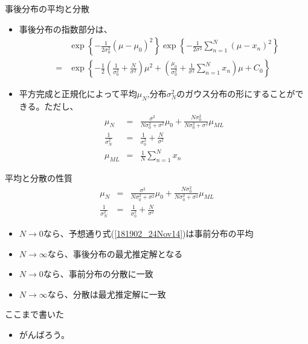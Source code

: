 \begin{frame}{事後分布の平均と分散}
 \begin{itemize}
  \item 事後分布の指数部分は、
        \begin{eqnarray}
         & &\exp\left\{-\frac{1}{2\sigma_0^2}(\mu-\mu_0)^2\right\} \exp\left\{-\frac{1}{2\sigma^2}\sum_{n=1}^{N}(\mu-x_n)^2\right\} \nonumber \\
         &= & \exp\left\{-\frac{1}{2}\left(\frac{1}{\sigma_0^2}+\frac{N}{\sigma^2}\right)\mu^2 +\left(\frac{\mu_0}{\sigma_0^2}+\frac{1}{\sigma^2}\sum_{n=1}^{N}x_n\right)\mu +C_0 \right\} \nonumber
        \end{eqnarray}
  \item 平方完成と正規化によって平均$\mu_N$,分布$\sigma_N^2$のガウス分布の形にすることができる。ただし、
        \begin{eqnarray}
         \mu_N& = & \frac{\sigma^2}{N\sigma_0^2+\sigma^2}\mu_0 + \frac{N\sigma_0^2}{N\sigma_0^2+\sigma^2}\mu_{ML}\label{223654_18Nov14}\\
         \frac{1}{\sigma_N^2}&= & \frac{1}{\sigma_0^2} + \frac{N}{\sigma^2}\label{181817_24Nov14}\\
         \mu_{ML}&= & \frac{1}{N}\sum_{n=1}^{N}x_n
        \end{eqnarray}
 \end{itemize}
\end{frame}

\begin{frame}{平均と分散の性質}
 \begin{eqnarray}
  \mu_N& = & \frac{\sigma^2}{N\sigma_0^2+\sigma^2}\mu_0 + \frac{N\sigma_0^2}{N\sigma_0^2+\sigma^2}\mu_{ML}\label{181902_24Nov14}\\
  \frac{1}{\sigma_N^2}&= & \frac{1}{\sigma_0^2} + \frac{N}{\sigma^2}
 \end{eqnarray}
 \begin{itemize}
  \item $N\rightarrow0$なら、予想通り式(\ref{181902_24Nov14})は事前分布の平均
  \item $N\rightarrow\infty$なら、事後分布の最尤推定解となる
  \item $N\rightarrow0$なら、事前分布の分散に一致
  \item $N\rightarrow\infty$なら、分散は最尤推定解に一致
 \end{itemize}
\end{frame}

\begin{frame}{ここまで書いた}
 \begin{itemize}
  \item がんばろう。
 \end{itemize}
\end{frame}

